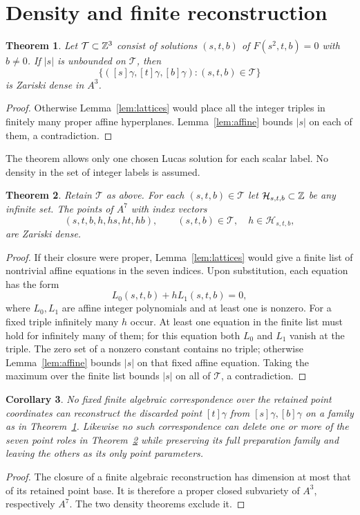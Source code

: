 \documentclass[11pt,a4paper]{article}
\newtheorem{theorem}{Theorem}[section]
\newtheorem{corollary}[theorem]{Corollary}
\begin{document}
\section{Density and finite reconstruction}

\begin{theorem}\label{thm:roots}
Let $\mathcal T\subset\mathbb Z^3$ consist of solutions $(s,t,b)$ of
$F(s^2,t,b)=0$ with $b\ne0$. If $|s|$ is unbounded on
$\mathcal T$, then
\[
 \{([s]\gamma,[t]\gamma,[b]\gamma):(s,t,b)\in\mathcal T\}
\]
is Zariski dense in $A^3$.
\end{theorem}
\begin{proof}
Otherwise Lemma~\ref{lem:lattices} would place all the integer
triples in finitely many proper affine hyperplanes. Lemma~\ref{lem:affine}
bounds $|s|$ on each of them, a contradiction.
\end{proof}

The theorem allows only one chosen Lucas solution for each scalar
label. No density in the set of integer labels is assumed.

\begin{theorem}\label{thm:auxiliary}
Retain $\mathcal T$ as above. For each $(s,t,b)\in\mathcal T$
let $\mathcal H_{s,t,b}\subset\mathbb Z$ be any infinite set. The points
of $A^7$ with index vectors
\[
 (s,t,b,h,hs,ht,hb),\qquad
 (s,t,b)\in\mathcal T,\quad h\in\mathcal H_{s,t,b},
\]
are Zariski dense.
\end{theorem}
\begin{proof}
If their closure were proper, Lemma~\ref{lem:lattices} would give
a finite list of nontrivial affine equations in the seven indices.
Upon substitution, each equation has the form
\[
 L_0(s,t,b)+hL_1(s,t,b)=0,
\]
where $L_0,L_1$ are affine integer polynomials and at least one is
nonzero. For a fixed triple infinitely many $h$ occur. At least one
equation in the finite list must hold for infinitely many of them;
for this equation both $L_0$ and $L_1$ vanish at the triple.
The zero set of a nonzero constant contains no triple; otherwise
Lemma~\ref{lem:affine} bounds $|s|$ on that fixed affine equation.
Taking the maximum over the finite list bounds $|s|$ on all of
$\mathcal T$, a contradiction.
\end{proof}

\begin{corollary}\label{cor:finite}
No fixed finite algebraic correspondence over the retained point
coordinates can reconstruct the discarded point $[t]\gamma$ from
$[s]\gamma,[b]\gamma$ on a family as in
Theorem~\ref{thm:roots}. Likewise no such correspondence can
delete one or more of the seven point roles in
Theorem~\ref{thm:auxiliary} while preserving its full preparation
family and leaving the others as its only point parameters.
\end{corollary}
\begin{proof}
The closure of a finite algebraic reconstruction has dimension at
most that of its retained point base. It is therefore a proper
closed subvariety of $A^3$, respectively $A^7$. The two density
theorems exclude it.
\end{proof}
\end{document}
